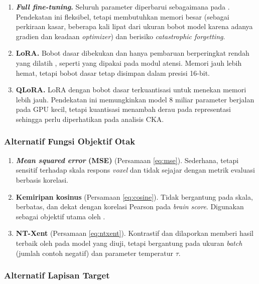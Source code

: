   \begin{enumerate}
      \item \textbf{\textit{Full fine-tuning}.} Seluruh parameter diperbarui sebagaimana pada \textcite{negi2025brain}. Pendekatan ini fleksibel, tetapi membutuhkan memori besar (sebagai perkiraan kasar, beberapa kali lipat dari ukuran bobot model karena adanya gradien dan keadaan \textit{optimizer}) dan berisiko \textit{catastrophic forgetting}.
      \item \textbf{LoRA.} Bobot dasar dibekukan dan hanya pembaruan berperingkat rendah yang dilatih \autocite{hu2022lora}, seperti yang dipakai \textcite{xiao2026beyond} pada modul atensi. Memori jauh lebih hemat, tetapi bobot dasar tetap disimpan dalam presisi 16-bit.
      \item \textbf{QLoRA.} LoRA dengan bobot dasar terkuantisasi untuk menekan memori lebih jauh. %
      Pendekatan ini memungkinkan model 8 miliar parameter berjalan pada GPU kecil, tetapi kuantisasi menambah derau pada representasi sehingga perlu diperhatikan pada analisis CKA.
  \end{enumerate}

  \subsubsection{Alternatif Fungsi Objektif Otak}

  \begin{enumerate}
      \item \textbf{\textit{Mean squared error} (MSE)} (Persamaan \ref{eq:mse}). Sederhana, tetapi sensitif terhadap skala respons \textit{voxel} dan tidak sejajar dengan metrik evaluasi berbasis korelasi.
      \item \textbf{Kemiripan kosinus} (Persamaan \ref{eq:cosine}). Tidak bergantung pada skala, berbatas, dan dekat dengan korelasi Pearson pada \textit{brain score}. Digunakan sebagai objektif utama oleh \textcite{xiao2026beyond}.
      \item \textbf{NT-Xent} (Persamaan \ref{eq:ntxent}). Kontrastif dan dilaporkan memberi hasil terbaik oleh \textcite{negi2025brain} pada model yang diuji, tetapi bergantung pada ukuran \textit{batch} (jumlah contoh negatif) dan parameter temperatur $\tau$.
  \end{enumerate}

  \subsubsection{Alternatif Lapisan Target}


